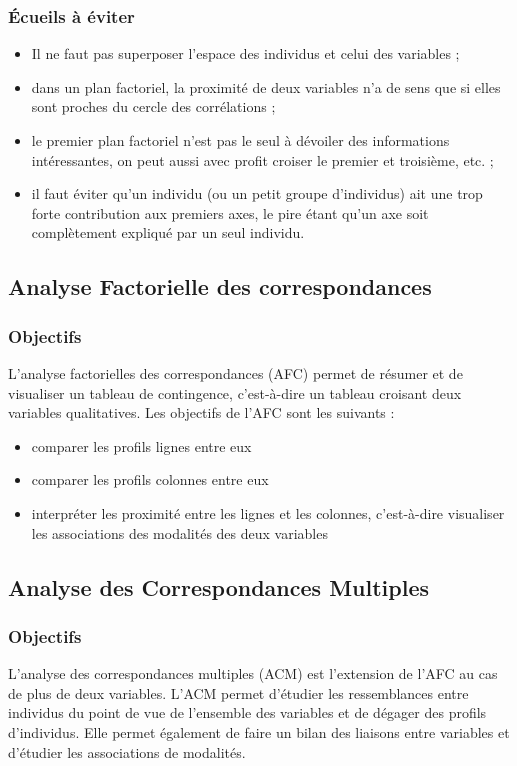 \documentclass[a4paper]{report}
\begin{document}
\subsubsection{Écueils à éviter}
\begin{itemize}
\item Il ne faut pas superposer l'espace des individus et celui des variables ;
\item dans un plan factoriel, la proximité de deux variables n'a de sens que si elles sont proches du cercle des corrélations ;
\item le premier plan factoriel n'est pas le seul à dévoiler des informations intéressantes, on peut aussi avec profit croiser le premier et troisième, etc. ;
\item il faut éviter qu'un individu (ou un petit groupe d'individus) ait une trop forte contribution aux premiers axes, le pire étant qu'un axe soit complètement expliqué par un seul individu.
\end{itemize}


\subsection{Analyse Factorielle des correspondances}

\subsubsection{Objectifs}
L'analyse factorielles des correspondances (AFC) permet de résumer et de visualiser un tableau de contingence, c'est-à-dire un tableau croisant deux variables qualitatives. Les objectifs de l'AFC sont les suivants :
 \begin{itemize}
 \item comparer les profils lignes entre eux
 \item comparer les profils colonnes entre eux
 \item interpréter les proximité entre les lignes et les colonnes, c'est-à-dire visualiser les associations des modalités des deux variables
 \end{itemize}

\subsection{Analyse des Correspondances Multiples}

\subsubsection{Objectifs}
L'analyse des correspondances multiples (ACM) est l'extension de l'AFC au cas de plus de deux variables. L'ACM permet d'étudier les ressemblances entre individus du point de vue de l'ensemble des variables et de dégager des profils d'individus. Elle permet également de faire un bilan des liaisons entre variables et d'étudier les associations de modalités.
\end{document}
